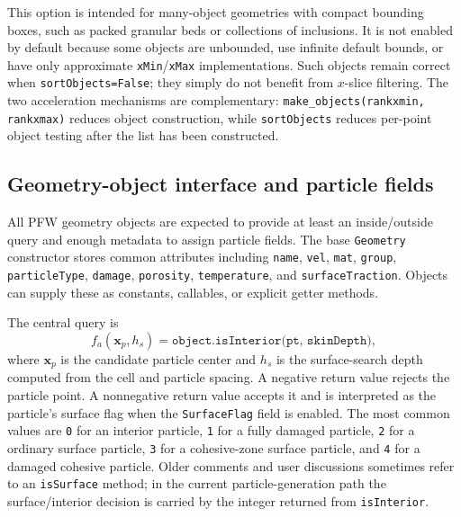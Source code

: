 This option is intended for many-object geometries with compact bounding boxes, such as packed granular beds or collections of inclusions.  It is not enabled by default because some objects are unbounded, use infinite default bounds, or have only approximate \texttt{xMin}/\texttt{xMax} implementations.  Such objects remain correct when \texttt{sortObjects=False}; they simply do not benefit from $x$-slice filtering.  The two acceleration mechanisms are complementary: \texttt{make\_objects(rankxmin, rankxmax)} reduces object construction, while \texttt{sortObjects} reduces per-point object testing after the list has been constructed.

\subsection{Geometry-object interface and particle fields}

All PFW geometry objects are expected to provide at least an inside/outside query and enough metadata to assign particle fields.  The base \texttt{Geometry} constructor stores common attributes including \texttt{name}, \texttt{vel}, \texttt{mat}, \texttt{group}, \texttt{particleType}, \texttt{damage}, \texttt{porosity}, \texttt{temperature}, and \texttt{surfaceTraction}.  Objects can supply these as constants, callables, or explicit getter methods.

The central query is
\begin{equation}
  f_a(\mathbf{x}_p,h_s)=\texttt{object.isInterior(pt, skinDepth)},
\end{equation}
where \(\mathbf{x}_p\) is the candidate particle center and \(h_s\) is the surface-search depth computed from the cell and particle spacing.  A negative return value rejects the particle point.  A nonnegative return value accepts it and is interpreted as the particle's surface flag when the \texttt{SurfaceFlag} field is enabled.  The most common values are \texttt{0} for an interior particle, \texttt{1} for a fully damaged particle, \texttt{2} for a ordinary surface particle, \texttt{3} for a cohesive-zone surface particle, and \texttt{4} for a damaged cohesive particle.  Older comments and user discussions sometimes refer to an \texttt{isSurface} method; in the current particle-generation path the surface/interior decision is carried by the integer returned from \texttt{isInterior}.

